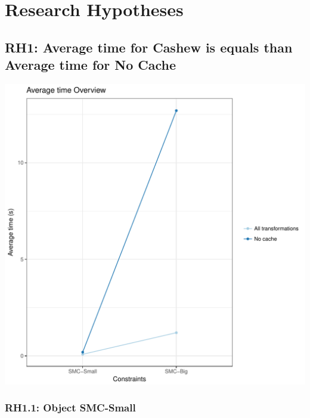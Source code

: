 \documentclass{article}\usepackage[]{graphicx}\usepackage[]{color}
\makeatletter
\def\maxwidth{ %
  \ifdim\Gin@nat@width>\linewidth
    \linewidth
  \else
    \Gin@nat@width
  \fi
}
\newenvironment{knitrout}{}{} %
\makeatother
\begin{document}
\section{Research Hypotheses}

\subsection{RH1: Average time for Cashew is equals than Average time for No Cache}


 
\begin{knitrout}
\color{fgcolor}
\includegraphics[width=\maxwidth]{figure/overview_RH1-1} 

\end{knitrout}
 	

\subsubsection{RH1.1: Object SMC-Small}
\end{document}
